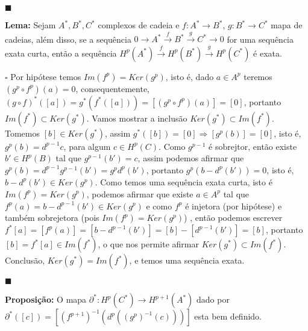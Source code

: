 \documentclass{article}
\begin{document}
	$\blacksquare$
	
	\vspace{2 mm}
	\textbf{Lema:} Sejam $A^{*}, B^{*}, C^{*}$ complexos de cadeia e $f:A^{*} \to B^{*}$, $g:B^{*} \to C^{*}$ mapa de cadeias, além disso, se a sequência $0 \to A^{*} \xrightarrow{f} B^{*} \xrightarrow{g} C^{*} \to 0$ for uma sequência exata curta, então a sequência $H^{p}(A^{*}) \xrightarrow{f} H^{p}(B^{*}) \xrightarrow{g} H^{p}(C^{*}) $ é exata.
	
	$\square$ Por hipótese temos $Im(f^{p}) = Ker(g^{p})$, isto é, dado $a \in A^{p}$ teremos $(g^{p}\circ f^{p})(a) = 0$, consequentemente, $(g\circ f)^{*}([a]) = g^{*}(f^{*}([a])) = [(g^{p}\circ f^{p})(a)] = [0]$, portanto $Im(f^{*}) \subset Ker(g^{*})$. Vamos mostrar a inclusão $Ker(g^{*}) \subset Im(f^{*})$. Tomemos $[b] \in Ker(g^{*})$, assim $g^{*}([b]) = [0] \Rightarrow [g^{p}(b)] = [0]$, isto é, $g^{p}(b) = d^{p-1}c$, para algum $c \in H^{p}(C)$. Como $g^{p-1}$ é sobrejtor, então existe $b' \in H^{p}(B)$ tal que $g^{p-1}(b') = c$, assim podemos afirmar que $g^{p}(b) = d^{p-1}g^{p-1}(b') = g^{p}d^{p}(b')$, portanto $g^{p}(b - d^{p}(b')) = 0$, isto é, $b - d^{p}(b') \in Ker(g^{p})$. Como temos uma sequência exata curta, isto é $Im(f^{p}) = Ker(g^{p})$, podemos afirmar que existe $a \in A^{p}$ tal que $f^{p}(a) = b - d^{p-1}(b') \in Ker(g^{p})$ e como $f^{p}$ é injetora (por hipótese) e também sobrejetora (pois $Im(f^{p}) = Ker(g^{p})$) , então podemos escrever $f^{*}[a] = [f^{p}(a)] = [b - d^{p-1}(b')] =  [b] - [d^{p-1}(b')] = [b]$, portanto $[b] = f^{*}[a] \in Im(f^{*})$, o que nos permite afirmar $Ker(g^{*}) \subset Im(f^{*})$. Conclusão, $Ker(g^{*}) = Im(f^{*})$, e temos uma sequência exata. 
	
	$\blacksquare$

	\vspace{2 mm}
	\textbf{Proposição:} O mapa $\partial^{*}: H^{p}(C^{*}) \to H^{p+1}(A^{*})$ dado por $\partial^{*}([c]) = [(f^{p+1})^{-1}(d^{p}((g^{p})^{-1}(c)))] $ esta bem definido.
	
\end{document}
